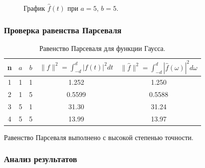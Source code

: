 \documentclass[a5paper, 10pt]{article}
\theoremstyle{definition}
\theoremstyle{plain}
\theoremstyle{remark}
\begin{document}
\begin{figure}[h!]
\caption{График $\hat{f}(t)$ при $a = 5$, $b = 5$.}
\end{figure}





\subsubsection{Проверка равенства Парсеваля}

\begin{table}[h!]
\caption{Равенство Парсеваля для функции Гаусса.}
\label{tabular:timesandtenses}
\begin{center}
\begin{tabular}{|c|c|c|c|c|}
\hline
n & $a$ & $b$ & $\| f \|^2 = \int_{-d}^d |f(t)|^2 dt $ & $\| \hat{f} \|^2 = \int_{-d}^d |\hat{f}(\omega)|^2 d\omega $ \\
\hline
1 & 1 & 1 &  1.252& 1.250\\
\hline
2 & 1 & 5 & 0.5599 & 0.5588 \\
\hline
3 & 5 & 1 & 31.30  & 31.24 \\
\hline
4 & 5 & 5 & 13.99  & 13.97\\
\hline
\end{tabular}
\end{center}
\end{table}

Равенство Парсеваля выполнено с высокой степенью точности.


\newpage
\subsubsection{Анализ результатов}
\end{document}
